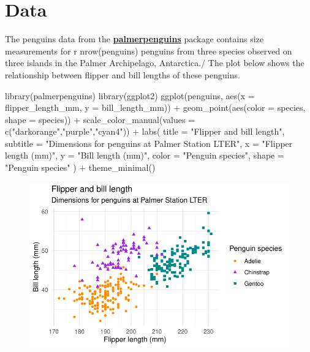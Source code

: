 \documentclass[
  a4paper,
]{scrbook}
\newenvironment{Shaded}{\begin{snugshade}}{\end{snugshade}}
\newcommand{\AttributeTok}[1]{\textcolor[rgb]{0.15,0.55,0.82}{#1}}
\newcommand{\FunctionTok}[1]{\textcolor[rgb]{0.15,0.55,0.82}{#1}}
\newcommand{\NormalTok}[1]{\textcolor[rgb]{0.40,0.48,0.51}{#1}}
\newcommand{\SpecialCharTok}[1]{\textcolor[rgb]{0.86,0.20,0.18}{#1}}
\newcommand{\StringTok}[1]{\textcolor[rgb]{0.16,0.63,0.60}{#1}}
\begin{document}
\hypertarget{data}{%
\section{Data}\label{data}}

The penguins data from the
\href{https://allisonhorst.github.io/palmerpenguins}{\textbf{palmerpenguins}}
package contains size measurements for r nrow(penguins) penguins from
three species observed on three islands in the Palmer Archipelago,
Antarctica./ The plot below shows the relationship between flipper and
bill lengths of these penguins.

\begin{Shaded}
\begin{Highlighting}[numbers=left,,]
\FunctionTok{library}\NormalTok{(palmerpenguins)}
\FunctionTok{library}\NormalTok{(ggplot2)}
\FunctionTok{ggplot}\NormalTok{(penguins, }
       \FunctionTok{aes}\NormalTok{(}\AttributeTok{x =}\NormalTok{ flipper\_length\_mm, }\AttributeTok{y =}\NormalTok{ bill\_length\_mm)) }\SpecialCharTok{+}
  \FunctionTok{geom\_point}\NormalTok{(}\FunctionTok{aes}\NormalTok{(}\AttributeTok{color =}\NormalTok{ species, }\AttributeTok{shape =}\NormalTok{ species)) }\SpecialCharTok{+}
  \FunctionTok{scale\_color\_manual}\NormalTok{(}\AttributeTok{values =} \FunctionTok{c}\NormalTok{(}\StringTok{"darkorange"}\NormalTok{,}\StringTok{"purple"}\NormalTok{,}\StringTok{"cyan4"}\NormalTok{)) }\SpecialCharTok{+}
  \FunctionTok{labs}\NormalTok{(}
    \AttributeTok{title =} \StringTok{"Flipper and bill length"}\NormalTok{,}
    \AttributeTok{subtitle =} \StringTok{"Dimensions for penguins at Palmer Station LTER"}\NormalTok{,}
    \AttributeTok{x =} \StringTok{"Flipper length (mm)"}\NormalTok{, }\AttributeTok{y =} \StringTok{"Bill length (mm)"}\NormalTok{,}
    \AttributeTok{color =} \StringTok{"Penguin species"}\NormalTok{, }\AttributeTok{shape =} \StringTok{"Penguin species"}
\NormalTok{  ) }\SpecialCharTok{+}
  \FunctionTok{theme\_minimal}\NormalTok{()}
\end{Highlighting}
\end{Shaded}

\begin{figure}[H]

{\centering \includegraphics{./resultats_files/figure-pdf/plot-penguins-1.pdf}

}

\end{figure}
\end{document}
